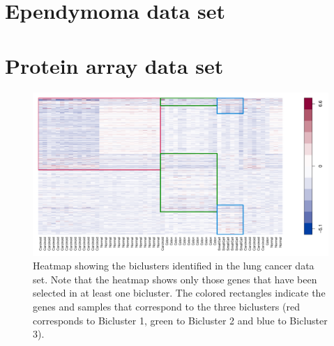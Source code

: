 \section{Ependymoma data set}
\section{Protein array data set}


\begin{figure}[t]
\includegraphics[width=145 mm]{./Bilder/lungheatmap.pdf}
\caption{ Heatmap showing the biclusters identified in the lung cancer data set. Note that the heatmap shows only those genes that have been selected in at least one bicluster. The colored rectangles indicate the genes and samples that correspond to the three biclusters (red corresponds to Bicluster 1, green to Bicluster 2 and blue to Bicluster 3). \label{fig:01} 
}
\end{figure}

